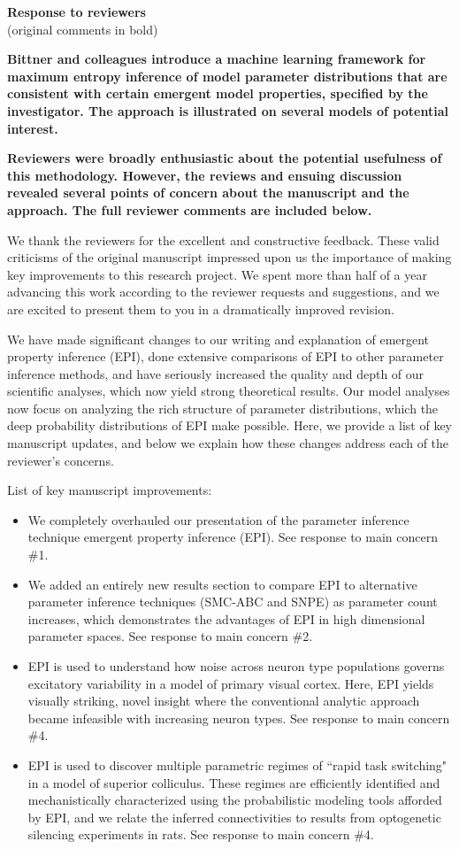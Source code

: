 \documentclass[11pt,a4paper]{article}
\begin{document}
 

{\Large \textbf{Response to reviewers}} \\
(original comments in bold)

\textbf{Bittner and colleagues introduce a machine learning framework for maximum entropy inference of model parameter distributions that are consistent with certain emergent model properties, specified by the investigator. The approach is illustrated on several models of potential interest.} 

\textbf{Reviewers were broadly enthusiastic about the potential usefulness of this methodology. However, the reviews and ensuing discussion revealed several points of concern about the manuscript and the approach. The full reviewer comments are included below.} 

We thank the reviewers for the excellent and constructive feedback.  These valid criticisms of the original manuscript impressed upon us the importance of making key improvements to this research project.  We spent more than half of a year advancing this work according to the reviewer requests and suggestions, and we are excited to present them to you in a dramatically improved revision.

We have made significant changes to our writing and explanation of emergent property inference (EPI), done extensive comparisons of EPI to other parameter inference methods, and have seriously increased the quality and depth of our scientific analyses, which now yield strong theoretical results.  Our model analyses now focus on analyzing the rich structure of parameter distributions, which the deep probability distributions of EPI make possible.  Here, we provide a list of key manuscript updates, and below we explain how these changes address each of the reviewer’s concerns.

List of key manuscript improvements:
\begin{itemize}
\item We completely overhauled our presentation of the parameter inference technique emergent property inference (EPI). See response to main concern \#1.
\item We added an entirely new results section to compare EPI to alternative parameter inference techniques (SMC-ABC and SNPE) as parameter count increases, which demonstrates the advantages of EPI in high dimensional parameter spaces. See response to main concern \#2.
\item EPI is used to understand how noise across neuron type populations governs excitatory variability in a model of primary visual cortex.  
Here, EPI yields visually striking, novel insight where the conventional analytic approach became infeasible with increasing neuron types.  See response to main concern \#4.
\item EPI is used to discover multiple parametric regimes of ``rapid task switching" in a model of superior colliculus.  
These regimes are efficiently identified and mechanistically characterized using the probabilistic modeling tools afforded by EPI, and we relate the inferred connectivities to results from optogenetic silencing experiments in rats. See response to main concern \#4.
\end{itemize}
\end{document}
